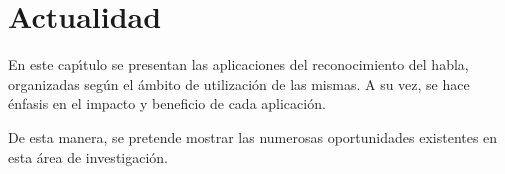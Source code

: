 \chapter{Actualidad}
\label{sec:areas-aplicacion}

En este cap{\'\i}tulo se presentan las aplicaciones del reconocimiento del habla, organizadas seg\'un el \'ambito
de utilizaci\'on de las mismas. A su vez, se hace \'enfasis en el impacto y beneficio de cada aplicaci\'on.

De esta manera, se pretende mostrar las numerosas oportunidades existentes en esta \'area de investigaci\'on.









